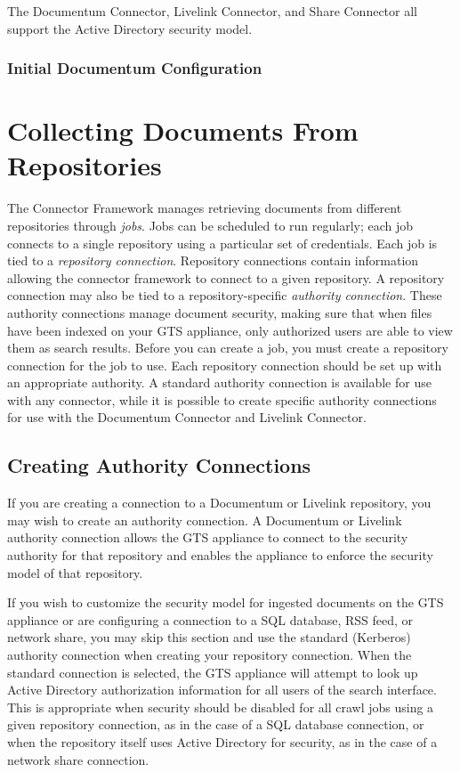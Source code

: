 \begin{changemargin}{1.5in}{0in}
The Documentum Connector, Livelink Connector, and Share Connector all
support the Active Directory security model. 

\subsubsection{Initial Documentum Configuration}



\section{Collecting Documents From Repositories} %

The Connector Framework manages retrieving documents from
different repositories through \emph{jobs}. Jobs can be scheduled
to run regularly; each job connects to a single repository using a
particular set of credentials. Each job is tied to a \emph{repository
connection}. Repository connections contain information allowing the
connector framework to connect to a given repository. A repository
connection may also be tied to a repository-specific \emph{authority
connection}. These authority connections manage document security,
making sure that when files have been indexed on your GTS appliance,
only authorized users are able to view them as search results. Before
you can create a job, you must create a repository connection for the job
to use. Each repository connection should be set up with an appropriate
authority. A standard authority connection is available for use with any
connector, while it is possible to create specific authority connections
for use with the Documentum Connector and Livelink Connector.

\subsection{Creating Authority Connections}

If you are creating a connection to a Documentum or Livelink
repository, you may wish to create an authority connection. A
Documentum or Livelink authority connection allows the GTS appliance
to connect to the security authority for that repository and enables
the appliance to enforce the security model of that repository.


If you wish to customize the security model for ingested documents on
the GTS appliance or are configuring a connection to a SQL database,
RSS feed, or network share, you may skip this section and use the
standard (Kerberos) authority connection when creating your repository
connection. When the standard connection is selected, the GTS appliance
will attempt to look up Active Directory authorization information for all
users of the search interface. This is appropriate when security should
be disabled for all crawl jobs using a given repository connection,
as in the case of a SQL database connection, or when the repository
itself uses Active Directory for security, as in the case of a network
share connection.


\end{changemargin}
